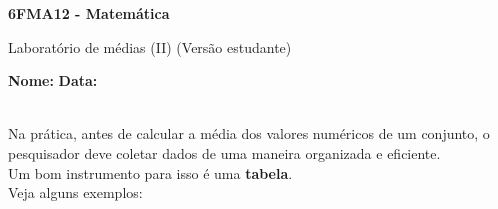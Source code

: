 \documentclass[a4paper,14pt]{article}
\begin{document}
	
	\noindent\textbf{6FMA12 - Matemática} 
	
	\begin{center}Laboratório de médias (II) (Versão estudante)
	\end{center}
	
	\noindent\textbf{Nome:} \underline{\hspace{10cm}}
	\noindent\textbf{Data:} \underline{\hspace{4cm}}
	
	
	\noindent \\ Na prática, antes de calcular a média dos valores numéricos de um conjunto, o pesquisador deve coletar dados de uma maneira organizada e eficiente. \\
	Um bom instrumento para isso é uma \textbf{tabela}. \\
	Veja alguns exemplos:
\end{document}
